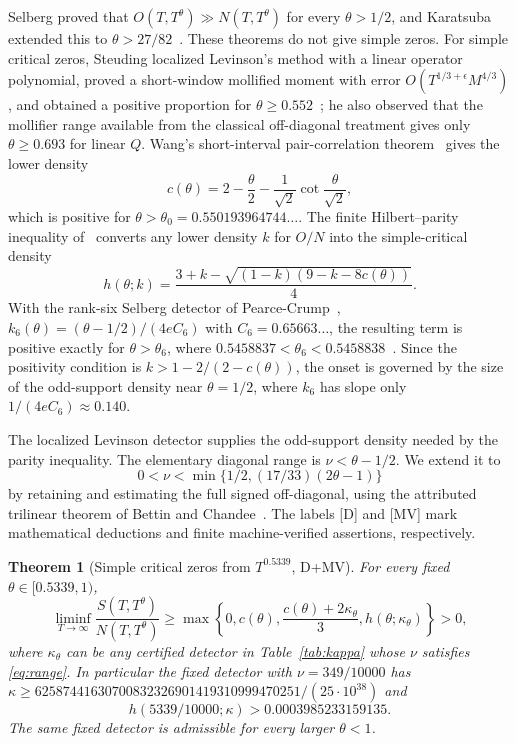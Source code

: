 \documentclass[11pt]{article}
\newtheorem{theorem}{Theorem}[section]
\theoremstyle{remark}
\begin{document}
Selberg proved that $O(T,T^\theta)\gg N(T,T^\theta)$ for every
$\theta>1/2$, and Karatsuba extended this to $\theta>27/82$~\cite{Karatsuba}.
These theorems do not give simple zeros. For simple critical zeros, Steuding
localized Levinson's method with a linear operator polynomial, proved a
short-window mollified moment with error $O(T^{1/3+\epsilon}M^{4/3})$, and
obtained a positive proportion for $\theta\ge0.552$~\cite{Steuding,SteudingThesis};
he also observed that the mollifier range available from the classical
off-diagonal treatment gives only $\theta\ge0.693$ for linear $Q$. Wang's short-interval
pair-correlation theorem~\cite{WangShort} gives the lower density
\begin{equation}\label{eq:wangc}
 c(\theta)=2-\frac\theta2-\frac1{\sqrt2}\cot\frac{\theta}{\sqrt2},
\end{equation}
which is positive for $\theta>\theta_0=0.550193964744\ldots$. The finite
Hilbert--parity inequality of~\cite[Proposition 2.5]{CAOSShort} converts any
lower density $k$ for $O/N$ into the simple-critical density
\begin{equation}\label{eq:h}
 h(\theta;k)=\frac{3+k-\sqrt{(1-k)(9-k-8c(\theta))}}4 .
\end{equation}
With the rank-six Selberg detector of Pearce-Crump~\cite{PearceCrump},
$k_6(\theta)=(\theta-1/2)/(4eC_6)$ with $C_6=0.65663\ldots$, the resulting
term is positive exactly for $\theta>\theta_6$, where
$0.5458837<\theta_6<0.5458838$~\cite[Theorem 1.2]{CAOSShort}. Since the
positivity condition is $k>1-2/(2-c(\theta))$, the onset is governed by the
size of the odd-support density near $\theta=1/2$, where $k_6$ has slope only
$1/(4eC_6)\approx0.140$.

The localized Levinson detector supplies the odd-support density needed
by the parity inequality. The elementary diagonal range is
$\nu<\theta-1/2$. We extend it to
\begin{equation}\label{eq:range}
 0<\nu<\min\{1/2,(17/33)(2\theta-1)\}
\end{equation}
by retaining and estimating the full signed off-diagonal, using the
attributed trilinear theorem of Bettin and Chandee~\cite{BC}.
The labels [D] and [MV] mark mathematical deductions and finite
machine-verified assertions, respectively.

\begin{theorem}[Simple critical zeros from $T^{0.5339}$, D+MV]
\label{thm:main}
For every fixed $\theta\in[0.5339,1)$,
\begin{equation}\label{eq:main}
 \liminf_{T\to\infty}\frac{S(T,T^\theta)}{N(T,T^\theta)}
 \ge\max\left\{0,c(\theta),\frac{c(\theta)+2\kappa_\theta}{3},
 h(\theta;\kappa_\theta)\right\}>0,
\end{equation}
where $\kappa_\theta$ can be any certified detector in
Table~\ref{tab:kappa} whose $\nu$ satisfies \eqref{eq:range}.
In particular the fixed detector with $\nu=349/10000$ has
$\kappa\ge62587441630700832326901419310999470251/(25\cdot10^{38})$ and
\[
 h(5339/10000;\kappa)>0.0003985233159135.
\]
The same fixed detector is admissible for every larger $\theta<1$.
\end{theorem}
\end{document}

